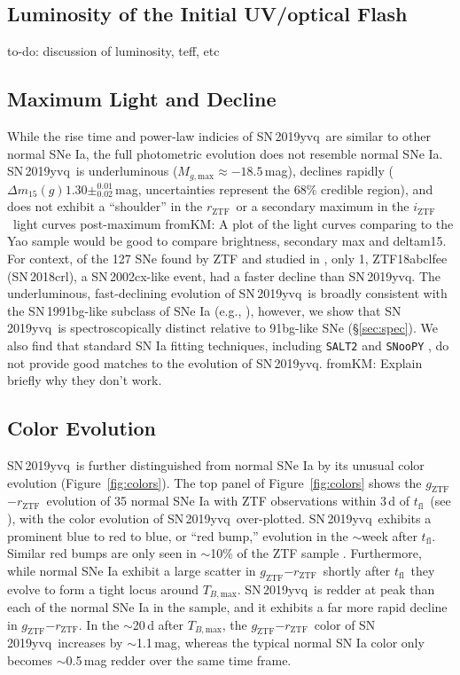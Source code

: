 \documentclass[twocolumn]{aastex63}
\newcommand{\fromkate}[1]{{\color{brown} fromKM: {#1}}}
\newcommand{\todo}[1]{{\color{magenta} to-do: {#1}}}
\newcommand{\rztf}{$r_\mathrm{ZTF}$}
\newcommand{\gztf}{$g_\mathrm{ZTF}$}
\newcommand{\iztf}{$i_\mathrm{ZTF}$}
\newcommand{\tfl}{$t_\mathrm{fl}$}
\newcommand{\tbmax}{$T_{B,\mathrm{max}}$}
\newcommand{\sn}{SN\,2019yvq}
\begin{document}
\subsection{Luminosity of the Initial UV/optical Flash}

\todo{discussion of luminosity, teff, etc}

\subsection{Maximum Light and Decline}

While the rise time and power-law indicies of \sn\ are similar to other
normal SNe Ia, the full photometric evolution does not resemble normal SNe
Ia. \sn\ is underluminous ($M_{g,\mathrm{max}} \approx -18.5$\,mag),
declines rapidly ($\Delta m_{15}(g) 1.30\pm^{0.01}_{0.02}$\,mag,
uncertainties represent the 68\% credible region), and does not exhibit a
``shoulder'' in the \rztf\ or a secondary maximum in the \iztf\ light curves
post-maximum \fromkate{A plot of the light curves comparing to the Yao
sample would be good to compare brightness, secondary max and deltam15}. For
context, of the 127 SNe found by ZTF and studied in \citet{Yao19}, only 1,
ZTF18abclfee (SN\,2018crl), a SN\,2002cx-like event, had a faster decline
than \sn. The underluminous, fast-declining evolution of \sn\ is broadly
consistent with the SN\,1991bg-like subclass of SNe Ia (e.g.,
\citealt{Taubenberger17}),
however, we show that \sn\ is spectroscopically distinct relative to
91bg-like SNe (\S\ref{sec:spec}). We also find that standard SN Ia fitting
techniques, including \texttt{SALT2} \citep{Guy07} and \texttt{SNooPY}
\citep{Burns11}, do not provide good matches to the evolution of \sn.
\fromkate{Explain briefly why they don't work.}

\subsection{Color Evolution}

\sn\ is further distinguished from normal SNe Ia by its unusual color
evolution (Figure~\ref{fig:colors}). The top panel of Figure~\ref{fig:colors}
shows the \gztf$ - $\rztf\ evolution of 35 normal SNe Ia with ZTF
observations within 3\,d of \tfl\ (see \citealt{Bulla20}), with the color
evolution of \sn\ over-plotted. \sn\ exhibits a prominent blue to red to
blue, or ``red bump,'' evolution in the $\sim$week after \tfl. Similar red
bumps are only seen in $\sim$10\% of the ZTF sample \citep{Bulla20}.
Furthermore, while normal SNe Ia exhibit a large scatter in \gztf$ - $\rztf\
shortly after \tfl\ they evolve to form a tight locus around \tbmax. \sn\ is redder at peak than each of the normal SNe Ia in the \citet{Bulla20} sample,
and it exhibits a far more rapid decline in \gztf$ - $\rztf. In the
$\sim$20\,d after \tbmax, the \gztf$ - $\rztf\ color of \sn\ increases by
$\sim$1.1\,mag, whereas the typical normal SN Ia color only becomes
$\sim$0.5\,mag redder over the same time frame. 
\end{document}
